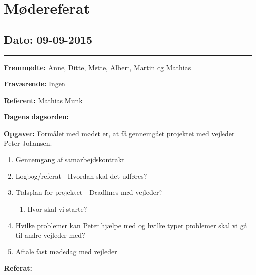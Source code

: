 \chapter{Mødereferat}

\section{Dato: 09-09-2015}
\hrule

\textbf{Fremmødte:} Anne, Ditte, Mette, Albert, Martin og Mathias

\textbf{Fraværende:} Ingen

\textbf{Referent:} Mathias Munk

\textbf{Dagens dagsorden:}

	\textbf{Opgaver:} \newline
Formålet med mødet er, at få gennemgået projektet med vejleder Peter Johansen.
\begin{enumerate}
\item Gennemgang af samarbejdskontrakt

\item Logbog/referat - Hvordan skal det udføres?

\item Tidsplan for projektet - Deadlines med vejleder?
\begin{enumerate}
\item Hvor skal vi starte?
\end{enumerate}
\item Hvilke problemer kan Peter hjælpe med og hvilke typer problemer skal vi gå til andre vejleder med?
\item Aftale fast mødedag med vejleder
\end{enumerate}


\textbf{Referat:}

